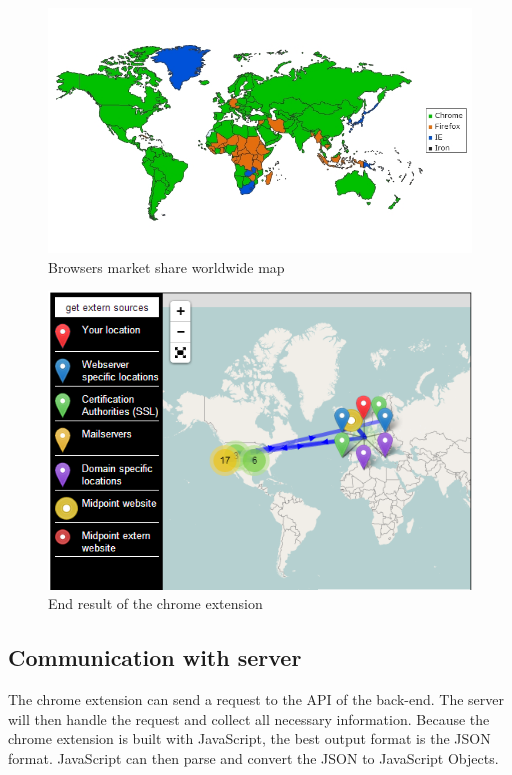 \documentclass[twoside,openright,notitlepage]{uva-bachelor-thesis}
\begin{document}
\begin{figure}[h!]
    \centering
    \includegraphics[width=1.0\textwidth, center]{img/market_share2.jpg}
    \caption{Browsers market share worldwide map}
    \label{fig:market_share2}
\end{figure}

\FloatBarrier

\begin{figure}[h!]
    \centering
    \includegraphics[width=1.0\textwidth, center]{img/tool.PNG}
    \caption{End result of the chrome extension}
    \label{fig:server}
\end{figure}

\subsection{Communication with server}
The chrome extension can send a request to the API of the back-end. The server will then handle the request and collect all necessary information. Because the chrome extension is built with JavaScript, the best output format is the JSON format. JavaScript can then parse and convert the JSON to JavaScript Objects.
\end{document}

